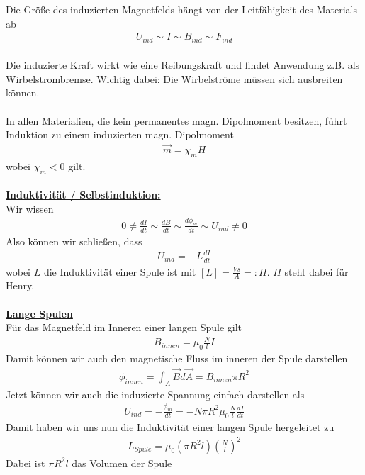 \documentclass[a4paper,12pt]{report}
\begin{document}
Die Größe des induzierten Magnetfelds hängt von der Leitfähigkeit des Materials ab 
\begin{align}
U_{ind} \sim I \sim B_{ind} \sim F_{ind}
\end{align}
\\
Die induzierte Kraft wirkt wie eine Reibungskraft und findet Anwendung z.B. als Wirbelstrombremse. Wichtig dabei: Die Wirbelströme müssen sich ausbreiten können. \\ \\
In allen Materialien, die kein permanentes magn. Dipolmoment besitzen, führt Induktion zu einem induzierten magn. Dipolmoment
\begin{align}
\vec{m} = \chi_m H 
\end{align} 
wobei $\chi_m < 0 $ gilt. \\ \\
\underline{\textbf{Induktivität / Selbstinduktion: }} \\ 
Wir wissen 
\begin{align}
0 \neq \frac{dI}{dt} \sim \frac{dB}{dt} \sim \frac{d\phi_m}{dt} \sim U_{ind} \neq 0
\end{align}
Also können wir schließen, dass 
\begin{align}
U_{ind} = - L \frac{dI}{dt}
\end{align}
wobei $L$ die Induktivität einer Spule ist mit $[L] = \frac{Vs}{A} =: H$. $H$ steht dabei für Henry. \\ \\
\underline{\textbf{Lange Spulen}} \\
Für das Magnetfeld im Inneren einer langen Spule gilt 
\begin{align}
B_{innen} = \mu_0 \frac{N}{l} I
\end{align}
Damit können wir auch den magnetische Fluss im inneren der Spule darstellen
\begin{align}
\phi_{innen} = \int_{A} \vec{B}d\vec{A} = B_{innen} \pi R^2 
\end{align}
Jetzt können wir auch die induzierte Spannung einfach darstellen als 
\begin{align}
U_{ind} = - \frac{\phi_m}{dt} = - N\pi R^2 \mu_0 \frac{N}{l} \frac{dI}{dt}
\end{align}
Damit haben wir uns nun die Induktivität einer langen Spule hergeleitet zu 
\begin{align}
L_{Spule} = \mu_0 (\pi R^2l)(\frac{N}{l})^2
\end{align}
Dabei ist $\pi R^2l$ das Volumen der Spule 
\end{document}
